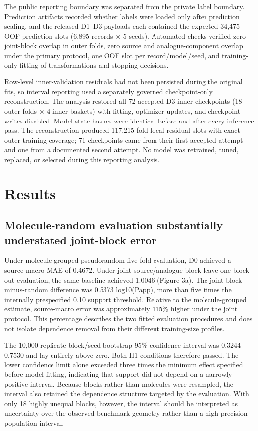 \documentclass[referee,lineno,pdflatex,Numbered,sn-basic]{sn-jnl}
\begin{document}
The public reporting boundary was separated from the private label boundary. Prediction artifacts recorded whether labels were loaded only after prediction sealing, and the released D1--D3 payloads each contained the expected 34,475 OOF prediction slots (6,895 records \ensuremath{\times} 5 seeds). Automated checks verified zero joint-block overlap in outer folds, zero source and analogue-component overlap under the primary protocol, one OOF slot per record/model/seed, and training-only fitting of transformations and stopping decisions.

Row-level inner-validation residuals had not been persisted during the original fits, so interval reporting used a separately governed checkpoint-only reconstruction. The analysis restored all 72 accepted D3 inner checkpoints (18 outer folds \ensuremath{\times} 4 inner baskets) with fitting, optimizer updates, and checkpoint writes disabled. Model-state hashes were identical before and after every inference pass. The reconstruction produced 117,215 fold-local residual slots with exact outer-training coverage; 71 checkpoints came from their first accepted attempt and one from a documented second attempt. No model was retrained, tuned, replaced, or selected during this reporting analysis.

\section{Results}

\subsection{Molecule-random evaluation substantially understated joint-block error}

Under molecule-grouped pseudorandom five-fold evaluation, D0 achieved a source-macro MAE of 0.4672. Under joint source/analogue-block leave-one-block-out evaluation, the same baseline achieved 1.0046 (Figure 3a). The joint-block-minus-random difference was 0.5373 log10(Papp), more than five times the internally prespecified 0.10 support threshold. Relative to the molecule-grouped estimate, source-macro error was approximately 115\% higher under the joint protocol. This percentage describes the two fitted evaluation procedures and does not isolate dependence removal from their different training-size profiles.

The 10,000-replicate block/seed bootstrap 95\% confidence interval was 0.3244--0.7530 and lay entirely above zero. Both H1 conditions therefore passed. The lower confidence limit alone exceeded three times the minimum effect specified before model fitting, indicating that support did not depend on a narrowly positive interval. Because blocks rather than molecules were resampled, the interval also retained the dependence structure targeted by the evaluation. With only 18 highly unequal blocks, however, the interval should be interpreted as uncertainty over the observed benchmark geometry rather than a high-precision population interval.
\end{document}
